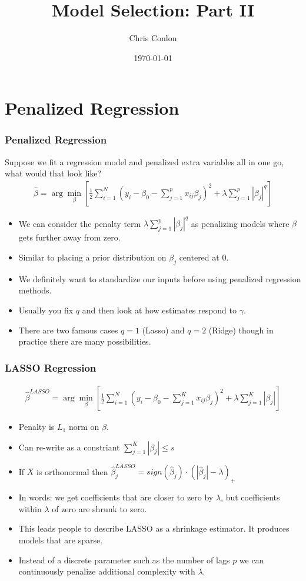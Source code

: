 \documentclass[aspectratio=169,11pt]{beamer}
\title{Model Selection: Part II}
\author{Chris Conlon}
\institute{Applied Econometrics}
\date{\today}
\begin{document}
\maketitle 
\section{Penalized Regression}


\begin{frame}
\frametitle{Penalized Regression}
\footnotesize
Suppose we fit a regression model and penalized extra variables all in one go, what would that look like?
\begin{align*}
\hat{\beta} = \arg \min_{\beta} \left[\frac{1}{2} \sum_{i=1}^N (y_i - \beta_0 - \sum_{j=1}^p x_{ij} \beta_j)^2 + \lambda \sum_{j=1}^p | \beta_j|^{q} \right]
\end{align*}
\begin{itemize}
\item We can consider the penalty term $\lambda \sum_{j=1}^p | \beta_j|^{q}$ as penalizing models where $\beta$ gets further away from zero.
\item Similar to placing a \alert{prior distribution} on $\beta_j$ centered at 0.
\item We definitely want to \alert{standardize} our inputs before using penalized regression methods.
\item Usually you fix $q$ and then look at how estimates respond to $\gamma$.
\item There are two famous cases $q=1$ (Lasso) and $q=2$ (Ridge) though in practice there are many possibilities.
\end{itemize}
\end{frame}


\begin{frame}
\frametitle{LASSO Regression}
\footnotesize
\begin{eqnarray*}
\hat{\beta}^{LASSO} = \arg \min_{\beta} \left[\frac{1}{2} \sum_{i=1}^N (y_i - \beta_0 - \sum_{j=1}^K x_{ij} \beta_j)^2 + \lambda \sum_{j=1}^K | \beta_j| \right]
\end{eqnarray*}
\begin{itemize}
\item Penalty is $L_1$ norm on $\beta$.
\item Can re-write as a constriant  $\sum_{j=1}^K | \beta_j| \leq s$
\item If $X$ is orthonormal then $\hat{\beta}_{j}^{LASSO} = sign(\hat{\beta}_j ) \cdot (| \hat{\beta}_j |- \lambda )_{+}$
\item In words: we get coefficients that are closer to zero by $\lambda$, but coefficients within $\lambda$ of zero are shrunk to zero.
\item This leads people to describe LASSO as a \alert{shrinkage} estimator. It produces models that are \alert{sparse}.
\item Instead of a discrete parameter such as the number of lags $p$ we can continuously penalize additional complexity with $\lambda$.
\end{itemize}
\end{frame}
\end{document}
